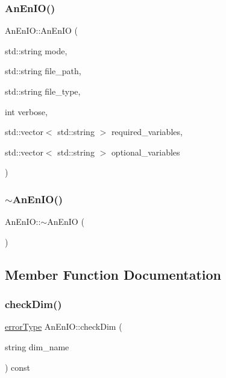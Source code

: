 \mbox{\label{class_an_en_i_o_ac040fa1dad19178f28b719f247e11b0d}} 
\subsubsection{\texorpdfstring{An\+En\+I\+O()}{AnEnIO()}\hspace{0.1cm}{\footnotesize\ttfamily [6/6]}}
{\footnotesize\ttfamily An\+En\+I\+O\+::\+An\+En\+IO (\begin{DoxyParamCaption}\item[{std\+::string}]{mode,  }\item[{std\+::string}]{file\+\_\+path,  }\item[{std\+::string}]{file\+\_\+type,  }\item[{int}]{verbose,  }\item[{std\+::vector$<$ std\+::string $>$}]{required\+\_\+variables,  }\item[{std\+::vector$<$ std\+::string $>$}]{optional\+\_\+variables }\end{DoxyParamCaption})}

\mbox{\label{class_an_en_i_o_a1e7aef95fd2a0c6aaef55998f48368f4}} 
\subsubsection{\texorpdfstring{$\sim$\+An\+En\+I\+O()}{~AnEnIO()}}
{\footnotesize\ttfamily An\+En\+I\+O\+::$\sim$\+An\+En\+IO (\begin{DoxyParamCaption}{ }\end{DoxyParamCaption})\hspace{0.3cm}{\ttfamily [virtual]}}



\subsection{Member Function Documentation}
\mbox{\label{class_an_en_i_o_ab99f9aebd7b145de00fe15b8d4869ac2}} 
\subsubsection{\texorpdfstring{check\+Dim()}{checkDim()}}
{\footnotesize\ttfamily \mbox{\hyperlink{class_an_en_i_o_aa56bc1ec6610b86db4349bce20f9ead0}{error\+Type}} An\+En\+I\+O\+::check\+Dim (\begin{DoxyParamCaption}\item[{string}]{dim\+\_\+name }\end{DoxyParamCaption}) const}

